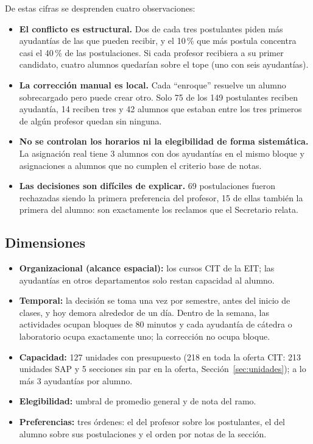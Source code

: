 \documentclass{article}
\begin{document}
De estas cifras se desprenden cuatro observaciones:
\begin{itemize}
    \item \textbf{El conflicto es estructural.} Dos de cada tres postulantes piden más ayudantías de las que pueden recibir, y el 10\,\% que más postula concentra casi el 40\,\% de las postulaciones. Si cada profesor recibiera a su primer candidato, cuatro alumnos quedarían sobre el tope (uno con seis ayudantías).
    \item \textbf{La corrección manual es local.} Cada ``enroque'' resuelve un alumno sobrecargado pero puede crear otro. Solo 75 de los 149 postulantes reciben ayudantía, 14 reciben tres y 42 alumnos que estaban entre los tres primeros de algún profesor quedan sin ninguna.
    \item \textbf{No se controlan los horarios ni la elegibilidad de forma sistemática.} La asignación real tiene 3 alumnos con dos ayudantías en el mismo bloque y \elegHistNo{} asignaciones a alumnos que no cumplen el criterio base de notas.
    \item \textbf{Las decisiones son difíciles de explicar.} 69 postulaciones fueron rechazadas siendo la primera preferencia del profesor, 15 de ellas también la primera del alumno: son exactamente los reclamos que el Secretario relata.
\end{itemize}

\subsection{Dimensiones}

\begin{itemize}
    \item \textbf{Organizacional (alcance espacial):} los cursos CIT de la EIT; las ayudantías en otros departamentos solo restan capacidad al alumno.
    \item \textbf{Temporal:} la decisión se toma una vez por semestre, antes del inicio de clases, y hoy demora alrededor de un día. Dentro de la semana, las actividades ocupan bloques de 80 minutos y cada ayudantía de cátedra o laboratorio ocupa exactamente uno; la corrección no ocupa bloque.
    \item \textbf{Capacidad:} 127 unidades con presupuesto (218 en toda la oferta CIT: 213 unidades SAP y 5 secciones sin par en la oferta, Sección~\ref{sec:unidades}); a lo más 3 ayudantías por alumno.
    \item \textbf{Elegibilidad:} umbral de promedio general y de nota del ramo.
    \item \textbf{Preferencias:} tres órdenes: el del profesor sobre los postulantes, el del alumno sobre sus postulaciones y el orden por notas de la sección.
\end{itemize}
\end{document}
